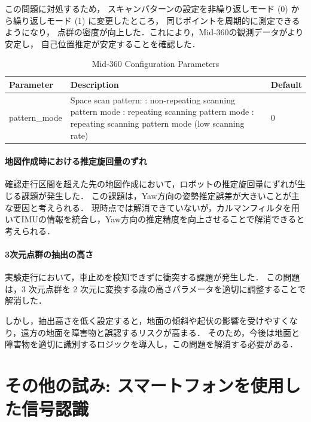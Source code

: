 \documentclass[twocolumn,9pt]{jsproceedings}
\begin{document}
この問題に対処するため，
スキャンパターンの設定を非繰り返しモード (0) から繰り返しモード (1) に変更したところ，
同じポイントを周期的に測定できるようになり，
点群の密度が向上した．これにより，Mid-360の観測データがより安定し，
自己位置推定が安定することを確認した．

\begin{table}[h]
  \centering
  \caption{Mid-360 Configuration Parameters}
  \begin{tabular}{|l|p{4.5cm}|l|}
      \hline
      \textbf{Parameter} & \textbf{Description} & \textbf{Default} \\
      \hline
      pattern\_mode &
      Space scan pattern: \newline
      0: non-repeating scanning pattern mode \newline
      1: repeating scanning pattern mode \newline
      2: repeating scanning pattern mode (low scanning rate) 
      & 0 \\
      \hline
  \end{tabular}
  \label{tab:lidar_params}
\end{table}

\paragraph{地図作成時における推定旋回量のずれ}
確認走行区間を超えた先の地図作成において，ロボットの推定旋回量にずれが生じる課題が発生した．
この課題は，Yaw方向の姿勢推定誤差が大きいことが主な要因と考えられる．
現時点では解消できていないが，カルマンフィルタを用いてIMUの情報を統合し，Yaw方向の推定精度を向上させることで解消できると考えられる．

\paragraph{3次元点群の抽出の高さ}
実験走行において，車止めを検知できずに衝突する課題が発生した．
この問題は，3 次元点群を 2 次元に変換する歳の高さパラメータを適切に調整することで解消した．

しかし，抽出高さを低く設定すると，地面の傾斜や起伏の影響を受けやすくなり，遠方の地面を障害物と誤認するリスクが高まる．
そのため，今後は地面と障害物を適切に識別するロジックを導入し，この問題を解消する必要がある．

\section{その他の試み: スマートフォンを使用した信号認識}
\end{document}

